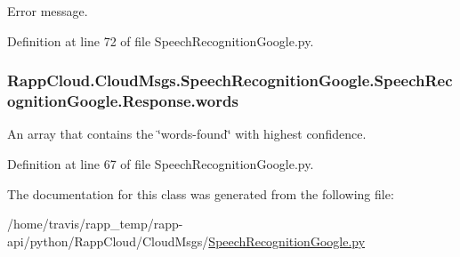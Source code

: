Error message. 



Definition at line 72 of file Speech\-Recognition\-Google.\-py.

\hypertarget{classRappCloud_1_1CloudMsgs_1_1SpeechRecognitionGoogle_1_1SpeechRecognitionGoogle_1_1Response_a7f6dc4528ad1627b1c59d1d59e64940d}{
\subsubsection[{words}]{\setlength{\rightskip}{0pt plus 5cm}Rapp\-Cloud.\-Cloud\-Msgs.\-Speech\-Recognition\-Google.\-Speech\-Recognition\-Google.\-Response.\-words}}\label{classRappCloud_1_1CloudMsgs_1_1SpeechRecognitionGoogle_1_1SpeechRecognitionGoogle_1_1Response_a7f6dc4528ad1627b1c59d1d59e64940d}


An array that contains the \char`\"{}words-\/found\char`\"{} with highest confidence. 



Definition at line 67 of file Speech\-Recognition\-Google.\-py.



The documentation for this class was generated from the following file\-:\begin{DoxyCompactItemize}
\item 
/home/travis/rapp\-\_\-temp/rapp-\/api/python/\-Rapp\-Cloud/\-Cloud\-Msgs/\hyperlink{SpeechRecognitionGoogle_8py}{Speech\-Recognition\-Google.\-py}\end{DoxyCompactItemize}
